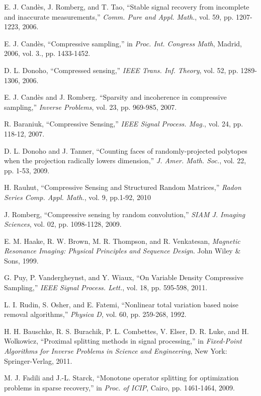 \documentclass[10pt,draftcls, onecolumn]{IEEEtran}
\begin{document}
\begin{thebibliography}{}
E. J. Cand\`{e}s, J. Romberg, and T. Tao, ``Stable signal recovery from incomplete and inaccurate measurements,'' \emph{Comm. Pure and Appl. Math.}, vol. 59, pp. 1207-1223, 2006.

E. J. Cand\`{e}s, ``Compressive sampling,'' in \emph{Proc. Int. Congress Math}, Madrid, 2006, vol. 3., pp. 1433-1452.

D. L. Donoho, ``Compressed sensing,'' \emph{IEEE Trans. Inf. Theory}, vol. 52, pp. 1289-1306, 2006.

E. J. Cand\`{e}s and J. Romberg. ``Sparsity and incoherence in compressive sampling,'' \emph{Inverse Problems}, vol. 23, pp. 969-985, 2007.

R. Baraniuk, ``Compressive Sensing,'' \emph{IEEE Signal Process. Mag.}, vol. 24, pp. 118-12, 2007.

D. L. Donoho and J. Tanner, ``Counting faces of randomly-projected polytopes when the projection radically lowers dimension,''  \emph{J. Amer. Math. Soc.}, vol. 22, pp. 1-53, 2009.

H. Rauhut, ``Compressive Sensing and Structured Random Matrices,''  \emph{Radon Series Comp. Appl. Math.}, vol. 9, pp.1-92, 2010

J. Romberg, ``Compressive sensing by random convolution,''  \emph{SIAM J. Imaging Sciences}, vol. 02, pp. 1098-1128, 2009.

E. M. Haake, R. W. Brown, M. R. Thompson, and R. Venkatesan, \emph{Magnetic Resonance Imaging: Physical Principles and Sequence Design}. John Wiley \& Sons, 1999.

G. Puy, P. Vandergheynst, and Y. Wiaux, ``On Variable Density Compressive Sampling,'' \emph{IEEE Signal Process. Lett.}, vol. 18, pp. 595-598, 2011.

L. I. Rudin, S. Osher, and E. Fatemi, ``Nonlinear total variation based noise removal algorithms,''  \emph{Physica D}, vol. 60, pp. 259-268, 1992.

H. H. Bauschke, R. S. Burachik, P. L. Combettes, V. Elser, D. R. Luke, and H. Wolkowicz, ``Proximal splitting methods in signal processing,'' in \emph{Fixed-Point Algorithms for Inverse Problems in Science and Engineering}, New York: Springer-Verlag, 2011.

M. J. Fadili and J.-L. Starck, ``Monotone operator splitting for optimization problems in sparse recovery,'' in \emph{Proc. of ICIP}, Cairo, pp. 1461-1464, 2009.

\end{thebibliography}
\end{document}
